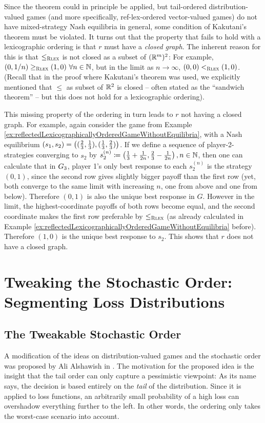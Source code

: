 \documentclass[a4paper,DIV=11]{scrreprt}
\theoremstyle{definition}
\begin{document}
    Since the theorem could in principle be applied, but tail-ordered distribution-valued games (and more specifically, ref-lex-ordered vector-valued games) do not have mixed-strategy Nash equilibria in general, some condition of Kakutani's theorem must be violated. 
    It turns out that the property that fails to hold with a lexicographic ordering is that $r$ must have a \emph{closed graph}.
    The inherent reason for this is that $\leq_{\textsc{Rlex}}$ is not closed as a subset of $(\mathbb{R}^m)^2$:
    For example, $(0, 1/n) \geq_{\textsc{Rlex}} (1, 0) ~ \forall n \in \mathbb{N}$, but in the limit as $n \to \infty$, $(0, 0) <_{\textsc{Rlex}} (1, 0)$.
    (Recall that in the proof where Kakutani's theorem was used, we explicitly mentioned that $\leq$ as subset of $\mathbb{R}^2$ is closed -- often stated as the “sandwich theorem” -- but this does not hold for a lexicographic ordering).
    
    This missing property of the ordering in turn leads to $r$ not having a closed graph. For example, again consider the game from Example \ref{ex:reflectedLexicographicallyOrderedGameWithoutEquilibria}, with a Nash equilibrium $(s_1, s_2) = \left((\frac{2}{3}, \frac{1}{3}), (\frac{1}{3}, \frac{2}{3})\right)$.
    If we define a sequence of player-2-strategies converging to $s_2$ by $s_2^{(n)} \coloneqq \left(\frac{1}{3} + \frac{1}{2n}, \frac{2}{3} - \frac{1}{2n}\right), n \in \mathbb{N}$, then one can calculate that in $G_{3}$, player 1's only best response to each $s_2^{(n)}$ is the strategy $(0, 1)$, since the second row gives slightly bigger payoff than the first row (yet, both converge to the same limit with increasing $n$, one from above and one from below). Therefore $(0, 1)$ is also the unique best response in $G$.
    However in the limit, the highest-coordinate payoffs of both rows become equal, and the second coordinate makes the first row preferable by $\leq_{\textsc{Rlex}}$ (as already calculated in Example \ref{ex:reflectedLexicographicallyOrderedGameWithoutEquilibria} before). Therefore $(1, 0)$ is the unique best response to $s_2$. This shows that $r$ does not have a closed graph.
    
    \chapter{Tweaking the Stochastic Order: Segmenting Loss Distributions}
    \label{chap:segmentingLossDistributions}
    
    \section{The Tweakable Stochastic Order}
    A modification of the ideas on distribution-valued games and the stochastic order was proposed by Ali Alshawish in \cite{bib:tweakableStochasticOrders}.
    The motivation for the proposed idea is the insight that the tail order can only capture a pessimistic viewpoint: As its name says, the decision is based entirely on the \emph{tail} of the distribution. Since it is applied to loss functions, an arbitrarily small probability of a high loss can overshadow everything further to the left. In other words, the ordering only takes the worst-case scenario into account.
        
\end{document}
